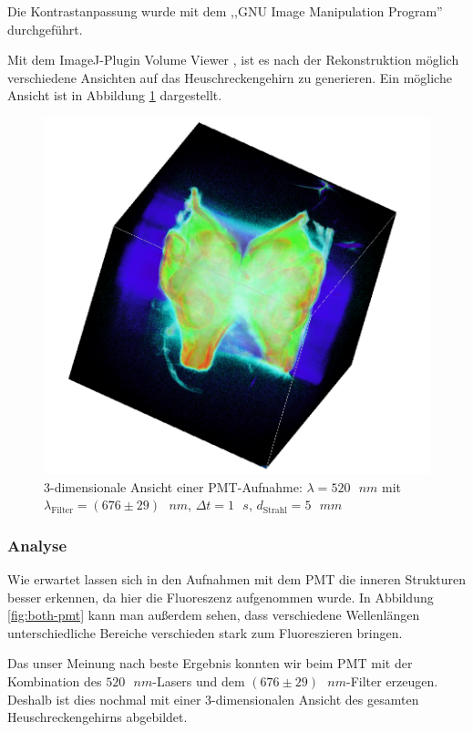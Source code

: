 Die Kontrastanpassung wurde mit dem ,,GNU Image Manipulation Program'' durchgeführt.

Mit dem ImageJ-Plugin \glqq Volume Viewer\grqq{} , ist es nach der Rekonstruktion möglich verschiedene Ansichten auf das Heuschreckengehirn zu generieren. Ein mögliche Ansicht ist in Abbildung \ref{fig:3d} dargestellt.

\begin{figure}[H]
\centering
\includegraphics[width=\linewidth]{IMAGE/3dtomo.png}
\caption{3-dimensionale Ansicht einer PMT-Aufnahme: $\lambda = 520 \text{ } \si{nm}$ mit\\ $\lambda_\text{Filter} = (676 \pm 29) \text{ } \si{nm}$, $\Delta{t} = 1 \text{ } \si{s}$, $d_\text{Strahl} = 5 \text{ } \si{mm}$}
	\label{fig:3d}
\end{figure}


\subsubsection{Analyse}
Wie erwartet lassen sich in den Aufnahmen mit dem PMT die inneren Strukturen besser erkennen, da hier die Fluoreszenz aufgenommen wurde.
In Abbildung \ref{fig:both-pmt} kann man außerdem sehen, dass verschiedene Wellenlängen unterschiedliche Bereiche verschieden stark zum Fluoreszieren bringen.

Das unser Meinung nach beste Ergebnis konnten wir beim PMT mit der Kombination des $520\text{ } \si{nm}$-Lasers und dem $(676 \pm 29)\text{ } \si{nm}$-Filter erzeugen.
Deshalb ist dies nochmal mit einer 3-dimensionalen Ansicht des gesamten Heuschreckengehirns abgebildet.

